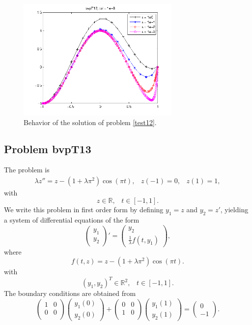 \documentclass[<options>]{article}
\def \RR {{\mathbb{R}}}
\begin{document}
\begin{figure}[htb]
\centerline{\includegraphics[height=6cm]{Prob12}}
\caption{Behavior of the solution of problem \ref{test12}.}
\end{figure}
\newpage
\subsection{Problem bvpT13}\label{test13}
The problem is
\begin{eqnarray*}
\lambda z'' =  z  - (1 +\lambda \pi^{2}) \cos(\pi t), \;\;\;z(-1) = 0, \;\;\; z(1) = 1,
\end{eqnarray*}
with
\[
z \in \RR, \;\;\; t\in [-1,1].
\]
We write this problem in first order form by defining $y_1=z$ and $y_2=z'$, yielding a system of differential equations of the form
\begin{equation*}
\left(\begin{array}{c}
y_1\\
y_2
\end{array}\right)'=
\left(\begin{array}{c}
y_2\\
\frac{1}{\lambda}f(t,y_1)
\end{array}\right),
\end{equation*}
where
\begin{equation*}
 f(t,z) = z  - (1 +\lambda \pi^{2}) \cos(\pi t).
\end{equation*}
with
\[
(y_1,y_2)^T \in \RR^{2}, \;\;\;  t \in [-1,1].
\]
The  boundary conditions are obtained from
\begin{equation*}
\left(
  \begin{array}{cc}
    1 & 0 \\
    0 & 0 \\
  \end{array}
\right)
\left(\begin{array}{c}
y_{1}(0)\\
y_{2}(0)
\end{array}\right)
+
\left(
  \begin{array}{cc}
    0 & 0 \\
    1 & 0 \\
  \end{array}
\right)
\left(\begin{array}{c}
y_{1}(1)\\
y_{2}(1)
\end{array}\right)=\left(\begin{array}{c}
0 \\
-1
\end{array}\right).
\end{equation*}
\end{document}
